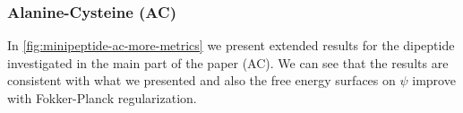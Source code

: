 \begin{table}[h]
\centering
{}
\vspace{0.2cm}
\caption{Comparison of methods based on the Wasserstein 1 distance of the C-N bond lengths to the reference data. Lower values are better. We have divided all entries by the Wasserstein 1 distance of \emph{Both} so that the numbers are easier to compare. In other words, numbers larger than 1 mean that the bonds are worse than \emph{Both}. }
\label{tab:aldp-w1-distances}
\end{table}

\subsubsection{Alanine-Cysteine (AC)} \label{appx:minpeptide-ac-more-metrics}
In \cref{fig:minipeptide-ac-more-metrics} we present extended results for the dipeptide investigated in the main part of the paper (AC). We can see that the results are consistent with what we presented and also the free energy surfaces on $\psi$ improve with Fokker-Planck regularization. 

